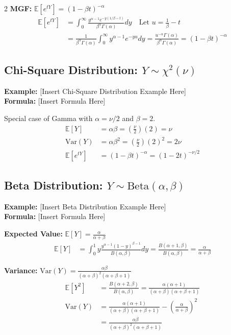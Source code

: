 \documentclass[11pt, letterpaper]{article}
\theoremstyle{definition}
\theoremstyle{remark}
\newcommand{\E}{\mathbb{E}}
\begin{document}
\begin{multicols*}{2}
\textbf{MGF:} $\E[e^{tY}] = (1-\beta t)^{-\alpha}$
\begin{align*}
\E[e^{tY}] &= \int_{0}^{\infty} \frac{y^{\alpha-1} e^{-y(1/\beta - t)}}{\beta^\alpha \Gamma(\alpha)} dy \quad \text{Let } u = \frac{1}{\beta} - t \\
&= \frac{1}{\beta^\alpha \Gamma(\alpha)} \int_{0}^{\infty} y^{\alpha-1} e^{-yu} dy = \frac{u^{-\alpha} \Gamma(\alpha)}{\beta^\alpha \Gamma(\alpha)} = (1-\beta t)^{-\alpha}
\end{align*}

\subsection{Chi-Square Distribution: $Y \sim \chi^2(\nu)$}
\textbf{Example:} [Insert Chi-Square Distribution Example Here] \\
\textbf{Formula:} [Insert Formula Here]

Special case of Gamma with $\alpha = \nu/2$ and $\beta = 2$.
\begin{align*}
\E[Y] &= \alpha\beta = \left(\frac{\nu}{2}\right)(2) = \nu \\
\text{Var}(Y) &= \alpha\beta^2 = \left(\frac{\nu}{2}\right)(2)^2 = 2\nu \\
\E[e^{tY}] &= (1-\beta t)^{-\alpha} = (1-2t)^{-\nu/2}
\end{align*}

\subsection{Beta Distribution: $Y \sim \text{Beta}(\alpha, \beta)$}
\textbf{Example:} [Insert Beta Distribution Example Here] \\
\textbf{Formula:} [Insert Formula Here]

\textbf{Expected Value:} $\E[Y] = \frac{\alpha}{\alpha+\beta}$
\begin{align*}
\E[Y] &= \int_{0}^{1} y \frac{y^{\alpha-1} (1-y)^{\beta-1}}{B(\alpha, \beta)} dy = \frac{B(\alpha+1, \beta)}{B(\alpha, \beta)} = \frac{\alpha}{\alpha+\beta}
\end{align*}

\textbf{Variance:} $\text{Var}(Y) = \frac{\alpha\beta}{(\alpha+\beta)^2(\alpha+\beta+1)}$
\begin{align*}
\E[Y^2] &= \frac{B(\alpha+2, \beta)}{B(\alpha, \beta)} = \frac{\alpha(\alpha+1)}{(\alpha+\beta)(\alpha+\beta+1)} \\
\text{Var}(Y) &= \frac{\alpha(\alpha+1)}{(\alpha+\beta)(\alpha+\beta+1)} - \left(\frac{\alpha}{\alpha+\beta}\right)^2 \\
&= \frac{\alpha\beta}{(\alpha+\beta)^2(\alpha+\beta+1)}
\end{align*}

\end{multicols*}
\end{document}

